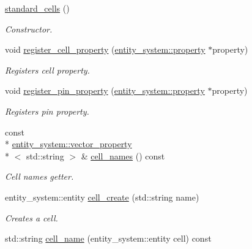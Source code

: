 \begin{DoxyCompactItemize}
\item 
\hyperlink{classophidian_1_1standard__cell_1_1standard__cells_a550904ff92dda77064942532e4ffb0cd}{standard\-\_\-cells} ()
\begin{DoxyCompactList}\small\item\em Constructor. \end{DoxyCompactList}\item 
void \hyperlink{classophidian_1_1standard__cell_1_1standard__cells_a59bdbe24b51d536117ba906ab376d6cc}{register\-\_\-cell\-\_\-property} (\hyperlink{classophidian_1_1entity__system_1_1property}{entity\-\_\-system\-::property} $\ast$property)
\begin{DoxyCompactList}\small\item\em Registers cell property. \end{DoxyCompactList}\item 
void \hyperlink{classophidian_1_1standard__cell_1_1standard__cells_a10d6efa4ce611c8ef30bedaa06a6ce35}{register\-\_\-pin\-\_\-property} (\hyperlink{classophidian_1_1entity__system_1_1property}{entity\-\_\-system\-::property} $\ast$property)
\begin{DoxyCompactList}\small\item\em Registers pin property. \end{DoxyCompactList}\item 
const \\*
\hyperlink{classophidian_1_1entity__system_1_1vector__property}{entity\-\_\-system\-::vector\-\_\-property}\\*
$<$ std\-::string $>$ \& \hyperlink{classophidian_1_1standard__cell_1_1standard__cells_ad6a4d7285bd8f1b33b70791f1e4c3c8f}{cell\-\_\-names} () const 
\begin{DoxyCompactList}\small\item\em Cell names getter. \end{DoxyCompactList}\item 
entity\-\_\-system\-::entity \hyperlink{classophidian_1_1standard__cell_1_1standard__cells_a3c5fefdff534fa2887e7248dbdfd47f2}{cell\-\_\-create} (std\-::string name)
\begin{DoxyCompactList}\small\item\em Creates a cell. \end{DoxyCompactList}\item 
std\-::string \hyperlink{classophidian_1_1standard__cell_1_1standard__cells_a418c0387f20b6a563b1a0fcde4e5c07c}{cell\-\_\-name} (entity\-\_\-system\-::entity cell) const 

\end{DoxyCompactItemize}
